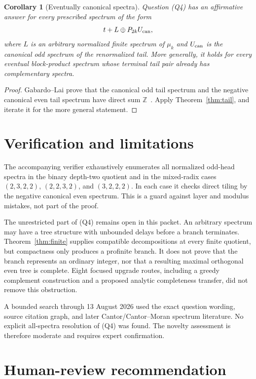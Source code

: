 \documentclass[11pt]{article}
\newtheorem{corollary}[theorem]{Corollary}
\newcommand{\Z}{\mathbb Z}
\begin{document}
\begin{corollary}[Eventually canonical spectra]\label{cor:canonical}
Question (Q4) has an affirmative answer for every prescribed spectrum of the
form
\[
 t+L\oplus P_{2k}U_{\rm can},
\]
where $L$ is an arbitrary normalized finite spectrum of $\mu_k$ and
$U_{\rm can}$ is the canonical odd spectrum of the renormalized tail.  More generally, it holds for
every eventual block-product spectrum whose terminal tail pair already has
complementary spectra.
\end{corollary}

\begin{proof}
Gabardo--Lai prove that the canonical odd tail spectrum and the negative
canonical even tail spectrum have direct sum $\Z$~\cite[Section~3]{GabardoLai}.
Apply Theorem~\ref{thm:tail}, and iterate it for the more general statement.
\end{proof}

\section{Verification and limitations}

The accompanying verifier exhaustively enumerates all normalized odd-head
spectra in the binary depth-two quotient and in the mixed-radix cases
$(2,3,2,2)$, $(2,2,3,2)$, and $(3,2,2,2)$.  In each case it checks direct
tiling by the negative canonical even spectrum.  This is a guard against
layer and modulus mistakes, not part of the proof.

The unrestricted part of (Q4) remains open in this packet.  An arbitrary
spectrum may have a tree structure with unbounded delays before a branch
terminates.  Theorem~\ref{thm:finite} supplies compatible decompositions at
every finite quotient, but compactness only produces a profinite branch.
It does not prove that the branch represents an ordinary integer, nor that a
resulting maximal orthogonal even tree is complete.  Eight focused upgrade
routes, including a greedy complement construction and a proposed analytic
completeness transfer, did not remove this obstruction.

A bounded search through 13 August 2026 used the exact question wording,
source citation graph, and later Cantor/Cantor--Moran spectrum literature.  No
explicit all-spectra resolution of (Q4) was found.  The novelty assessment is
therefore moderate and requires expert confirmation.

\section{Human-review recommendation}
\end{document}
